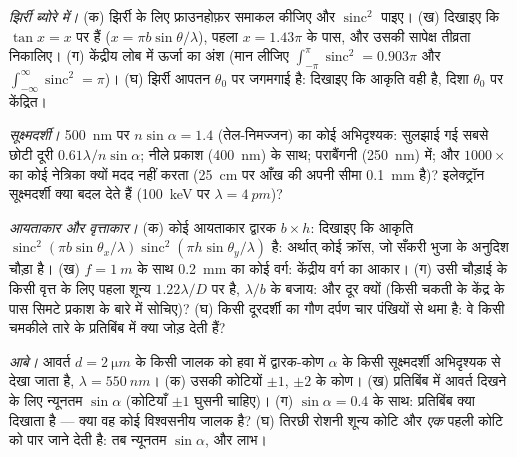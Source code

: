 \begin{exercise}[$\star\star$]\label{exo:b2:diffraction:5}
\emph{झिर्री ब्योरे में।} (क) झिर्री के लिए फ्राउनहोफ़र समाकल कीजिए
और $\operatorname{sinc}^2$ पाइए। (ख) दिखाइए कि 
$\tan x = x$ पर हैं ($x = \pi b\sin\theta/\lambda$), पहला $x = 1.43\pi$ के पास, और
उसकी सापेक्ष तीव्रता निकालिए। (ग) केंद्रीय लोब में ऊर्जा का
अंश (मान लीजिए $\int_{-\pi}^\pi\operatorname{sinc}^2 = 0.903\pi$ और
$\int_{-\infty}^\infty\operatorname{sinc}^2 = \pi$)। (घ) झिर्री आपतन
$\theta_0$ पर जगमगाई है: दिखाइए कि आकृति वही है, दिशा $\theta_0$ पर केंद्रित।
\end{exercise}

\begin{exercise}[$\star\star$]\label{exo:b2:diffraction:6}
\emph{सूक्ष्मदर्शी।} \qty{500}{nm} पर  $n\sin\alpha = 1.4$
(तेल-निमज्जन) का कोई अभिदृश्यक: सुलझाई गई सबसे छोटी दूरी $0.61\lambda/n\sin
\alpha$; नीले प्रकाश (\qty{400}{nm}) के साथ; पराबैंगनी (\qty{250}{nm}) में; और
$1000\times$ का कोई नेत्रिका क्यों मदद नहीं करता (\qty{25}{cm} पर आँख की अपनी सीमा
\qty{0.1}{mm} है)? इलेक्ट्रॉन सूक्ष्मदर्शी क्या बदल देते हैं (\qty{100}{keV} पर $\lambda = \qty{4}{pm}$)?
\end{exercise}

\begin{exercise}[$\star\star$]\label{exo:b2:diffraction:7}
\emph{आयताकार और वृत्ताकार।} (क) कोई आयताकार द्वारक $b \times h$:
दिखाइए कि आकृति $\operatorname{sinc}^2(\pi b\sin\theta_x/\lambda)\operatorname{sinc}^2(\pi h
\sin\theta_y/\lambda)$ है: अर्थात् कोई क्रॉस, जो सँकरी भुजा के अनुदिश चौड़ा है। (ख) $f = \qty{1}{m}$ के साथ
\qty{0.2}{mm} का कोई वर्ग: केंद्रीय वर्ग का आकार। (ग) उसी चौड़ाई के किसी
वृत्त के लिए पहला शून्य $1.22\lambda/D$ पर है, $\lambda/b$ के बजाय:
और दूर क्यों (किसी चकती के केंद्र के पास सिमटे प्रकाश के बारे में
सोचिए)? (घ) किसी दूरदर्शी का गौण दर्पण चार पंखियों से थमा है: वे किसी चमकीले तारे के
प्रतिबिंब में क्या जोड़ देती हैं?
\end{exercise}

\begin{exercise}[$\star\star$]\label{exo:b2:diffraction:8}
\emph{आबे।} आवर्त $d = \qty{2}{\micro m}$ के किसी जालक को हवा में द्वारक-कोण $\alpha$ के
किसी सूक्ष्मदर्शी अभिदृश्यक से देखा जाता है, $\lambda = \qty{550}{nm}$।
(क) उसकी कोटियों $\pm1$, $\pm2$ के कोण। (ख) प्रतिबिंब में आवर्त दिखने के लिए
न्यूनतम $\sin\alpha$ (कोटियाँ $\pm1$ घुसनी चाहिए)। (ग) $\sin\alpha = 0.4$ के साथ: प्रतिबिंब
क्या दिखाता है --- क्या वह कोई विश्वसनीय जालक है? (घ) तिरछी
रोशनी शून्य कोटि और \emph{एक} पहली कोटि को पार जाने देती है:
तब न्यूनतम $\sin\alpha$, और लाभ।
\end{exercise}

